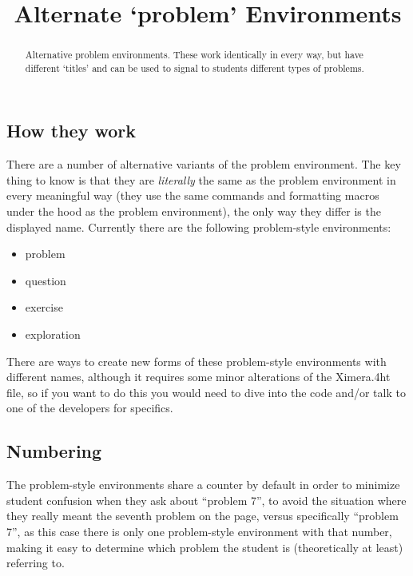 \documentclass{ximera}
\title{Alternate `problem' Environments}
\begin{document}
\begin{abstract}
    Alternative problem environments. These work identically in every way, but have different `titles' and can be used to signal to students different types of problems.
\end{abstract}
\maketitle

    \subsection*{How they work}
        
        There are a number of alternative variants of the problem environment. The key thing to know is that they are \textit{literally} the same as the problem environment in every meaningful way (they use the same commands and formatting macros under the hood as the problem environment), the only way they differ is the displayed name. Currently there are the following problem-style environments:
        
        \begin{itemize}
            \item problem
            \item question
            \item exercise
            \item exploration
        \end{itemize}
        
        There are ways to create new forms of these problem-style environments with different names, although it requires some minor alterations of the Ximera.4ht file, so if you want to do this you would need to dive into the code and/or talk to one of the developers for specifics.
    
    \subsection*{Numbering}
    
        The problem-style environments share a counter by default in order to minimize student confusion when they ask about ``problem 7'', to avoid the situation where they really meant the seventh problem on the page, versus specifically ``problem 7'', as this case there is only one problem-style environment with that number, making it easy to determine which problem the student is (theoretically at least) referring to.
    
\end{document}
